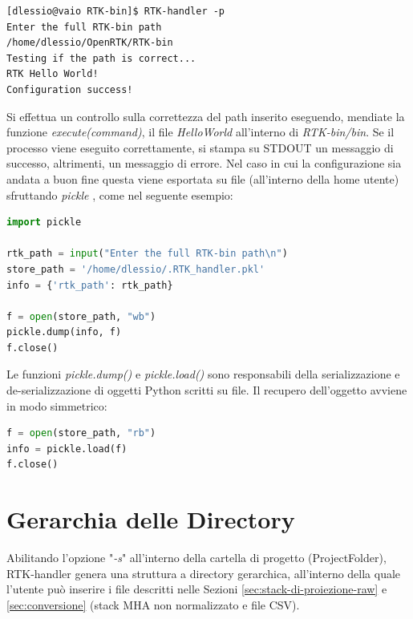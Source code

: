 \documentclass[a4paper,12pt, doubleside]{report}
\begin{document}
                \begin{lstlisting}[frame=bt]
[dlessio@vaio RTK-bin]$ RTK-handler -p
Enter the full RTK-bin path
/home/dlessio/OpenRTK/RTK-bin
Testing if the path is correct...
RTK Hello World!
Configuration success!
                \end{lstlisting}
            
                Si effettua un controllo sulla correttezza del path inserito eseguendo, mendiate la funzione \textit{execute(command)}, il file \textit{HelloWorld} all'interno di \textit{RTK-bin/bin}. Se il processo viene eseguito correttamente, si stampa su STDOUT un messaggio di successo, altrimenti, un messaggio di errore. Nel caso in cui la configurazione sia andata a buon fine questa viene esportata su file (all'interno della home utente) sfruttando \textit{pickle} \cite{python-pickle}, come nel seguente esempio:
                
                \begin{lstlisting}[language=python, frame=bt]
import pickle

rtk_path = input("Enter the full RTK-bin path\n")
store_path = '/home/dlessio/.RTK_handler.pkl'
info = {'rtk_path': rtk_path}

f = open(store_path, "wb")
pickle.dump(info, f)
f.close()
                \end{lstlisting}
                
                Le funzioni \textit{pickle.dump()} \cite{pkl-dump} e \textit{pickle.load()} \cite{pkl-load} sono responsabili della serializzazione e de-serializzazione di oggetti Python scritti su file. Il recupero dell'oggetto avviene in modo simmetrico:
                
                \begin{lstlisting}[language=python, frame=bt]  
f = open(store_path, "rb")
info = pickle.load(f)
f.close()
                \end{lstlisting}
                
        \section{Gerarchia delle Directory}
        \label{sec:architettura-directory}
            \par
                Abilitando l'opzione "\textit{-s}" all'interno della cartella di progetto (ProjectFolder), RTK-handler genera una struttura a directory gerarchica, all'interno della quale l'utente può inserire i file descritti nelle Sezioni \ref{sec:stack-di-proiezione-raw} e \ref{sec:conversione} (stack MHA non normalizzato e file CSV).
               
\end{document}
